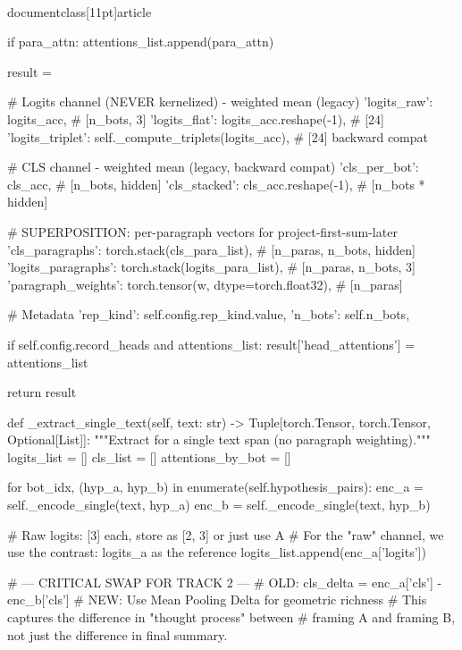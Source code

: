 \\documentclass[11pt]{article}
\begin{document}
\begin{CodeBlock}
            if para_attn:
                attentions_list.append(para_attn)

        result = {
            # Logits channel (NEVER kernelized) - weighted mean (legacy)
            'logits_raw': logits_acc,                    # [n_bots, 3]
            'logits_flat': logits_acc.reshape(-1),       # [24]
            'logits_triplet': self._compute_triplets(logits_acc),  # [24] backward compat

            # CLS channel - weighted mean (legacy, backward compat)
            'cls_per_bot': cls_acc,                      # [n_bots, hidden]
            'cls_stacked': cls_acc.reshape(-1),          # [n_bots * hidden]

            # SUPERPOSITION: per-paragraph vectors for project-first-sum-later
            'cls_paragraphs': torch.stack(cls_para_list),      # [n_paras, n_bots, hidden]
            'logits_paragraphs': torch.stack(logits_para_list),  # [n_paras, n_bots, 3]
            'paragraph_weights': torch.tensor(w, dtype=torch.float32),  # [n_paras]

            # Metadata
            'rep_kind': self.config.rep_kind.value,
            'n_bots': self.n_bots,
        }

        if self.config.record_heads and attentions_list:
            result['head_attentions'] = attentions_list

        return result
    
    def _extract_single_text(self, text: str) -> Tuple[torch.Tensor, torch.Tensor, Optional[List]]:
        """Extract for a single text span (no paragraph weighting)."""
        logits_list = []
        cls_list = []
        attentions_by_bot = []
        
        for bot_idx, (hyp_a, hyp_b) in enumerate(self.hypothesis_pairs):
            enc_a = self._encode_single(text, hyp_a)
            enc_b = self._encode_single(text, hyp_b)
            
            # Raw logits: [3] each, store as [2, 3] or just use A
            # For the "raw" channel, we use the contrast: logits_a as the reference
            logits_list.append(enc_a['logits'])
            
            # --- CRITICAL SWAP FOR TRACK 2 ---
            # OLD: cls_delta = enc_a['cls'] - enc_b['cls']
            # NEW: Use Mean Pooling Delta for geometric richness
            # This captures the difference in "thought process" between 
            # framing A and framing B, not just the difference in final summary.
            

\end{CodeBlock}
\end{document}
